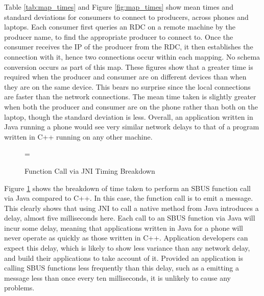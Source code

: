 \documentclass[12pt,twoside,notitlepage]{report}
\begin{document}
Table \ref{tab:map_times} and Figure \ref{fig:map_times} show mean times and standard deviations for consumers to connect to producers, across phones and laptops.
Each consumer first queries an RDC on a remote machine by the producer name, to find the appropriate producer to connect to. 
Once the consumer receives the IP of the producer from the RDC, it then establishes the connection with it, hence two connections occur within each mapping. 
No schema conversion occurs as part of this map. 
These figures show that a greater time is required when the producer and consumer are on different devices than when they are on the same device. 
This bears no surprise since the local connections are faster than the network connections. 
The mean time taken is slightly greater when both the producer and consumer are on the phone rather than both on the laptop, though the standard deviation is less. 
Overall, an application written in Java running a phone would see very similar network delays to that of a program written in C++ running on any other machine.

\begin{figure}[tbh]
\epsfxsize=\hsize
\centerline{}
\caption{Function Call via JNI Timing Breakdown}
\label{fig:jni_times}
\end{figure}

Figure \ref{fig:jni_times} shows the breakdown of time taken to perform an SBUS function call via Java compared to C++. 
In this case, the function call is to emit a message. 
This clearly shows that using JNI to call a native method from Java introduces a delay, almost five milliseconds here. 
Each call to an SBUS function via Java will incur some delay, meaning that applications written in Java for a phone will never operate as quickly as those written in C++.
Application developers can expect this delay, which is likely to show less variance than any network delay, and build their applications to take account of it. 
Provided an application is calling SBUS functions less frequently than this delay, such as a emitting a message less than once every ten milliseconds, it is unlikely to cause any problems.




\end{document}
